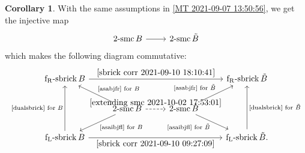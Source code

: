 \documentclass[pdftex,a4paper]{article}
\numberwithin{equation}{subsection}
\theoremstyle{definition}
\newtheorem{corollary}[theorem]{Corollary}
\newcommand{\flsbrick}{\operatorname{\mathrm{f_L-sbrick}}}
\newcommand{\frsbrick}{\operatorname{\mathrm{f_R-sbrick}}}
\newcommand{\twosmc}{\operatorname{\mathrm{2-smc}}}
\begin{document}
\begin{corollary}\label{MT smcsbrick 2021-10-03 21:01:38}
	With the same assumptions in \cref{MT 2021-09-07 13:50:56}, we get the injective map
	\begin{equation}\label{extending smc 2021-10-02 17:53:01}
		\begin{tikzcd}
			\twosmc B\ar[r]&\twosmc \tilde{B}
		\end{tikzcd}
	\end{equation}
	which makes the following diagram commutative:
	\begin{equation}
		\begin{tikzcd}
			\frsbrick B \ar[rrr,"\eqref{sbrick corr 2021-09-10 18:10:41}"]\ar[dr,leftarrow,"\text{\eqref{asabjfr} for \(B\)}"]\ar[dd,leftarrow,"\text{\eqref{dualsbrick} for \(B\)}"']& & &\frsbrick \tilde{B} \ar[dl,leftarrow,"\text{\eqref{asabjfr} for \(\tilde{B}\)}"'] \ar[dd,leftarrow,"\text{\eqref{dualsbrick} for \(\tilde{B}\)}"]\\
			&\twosmc B \ar[ld,"\text{\eqref{asaibjfl} for \(B\)}"]\ar[r,dashrightarrow,"\eqref{extending smc 2021-10-02 17:53:01}"]& \twosmc \tilde{B}\ar[rd,"\text{\eqref{asaibjfl} for \(\tilde{B}\)}"'] &
			\\
			\flsbrick B\ar[rrr,"\eqref{sbrick corr 2021-09-10 09:27:09}"']&&&\flsbrick \tilde{B}.
		\end{tikzcd}
	\end{equation}
\end{corollary}
\end{document}
